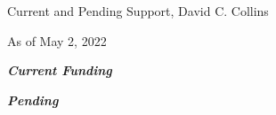 \documentclass[10pt]{article}
\begin{document}
\newcommand{\LT}[1]{\noindent\textbf{#1}}
\begin{LARGE}
\noindent Current and Pending Support, David C. Collins
\end{LARGE}

As of May 2, 2022



\vspace{0.1in}

\noindent \large{\textbf{\emph{Current Funding}}}

\vspace{0.1in}


\vspace{0.1in}



\vspace{0.1in}

\noindent \large{\textbf{\emph{Pending}}}

\vspace{0.1in}



\vspace{0.1in}



\vspace{0.1in}
\end{document}
